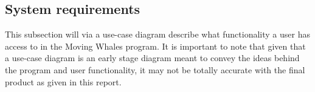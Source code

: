 \subsection{System requirements}

This subsection will via a use-case diagram describe what functionality a user has access to in the Moving Whales program. It is important to note that given that a use-case diagram is an early stage diagram meant to convey the ideas behind the program and user functionality, it may not be totally accurate with the final product as given in this report.
\clearpage

